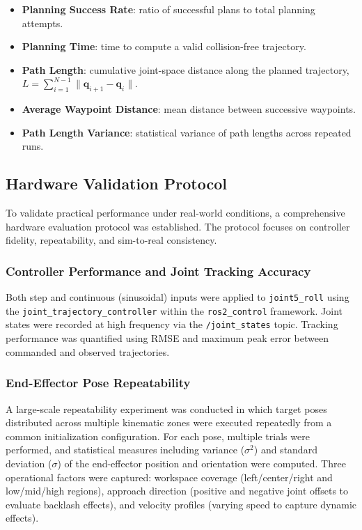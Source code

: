 \documentclass[conference]{IEEEtran}
\begin{document}
	\begin{itemize}
		\item \textbf{Planning Success Rate}: ratio of successful plans
		to total planning attempts.
		
		\item \textbf{Planning Time}: time to compute a valid
		collision-free trajectory.
		
		\item \textbf{Path Length}: cumulative joint-space distance
		along the planned trajectory,
		$L = \sum_{i=1}^{N-1}\|\mathbf{q}_{i+1} - \mathbf{q}_i\|$.
		
		\item \textbf{Average Waypoint Distance}: mean distance between
		successive waypoints.
		
		\item \textbf{Path Length Variance}: statistical variance of
		path lengths across repeated runs.
	\end{itemize}
	
	\subsection{Hardware Validation Protocol}
	
	To validate practical performance under real-world conditions, a
	comprehensive hardware evaluation protocol was established. The protocol focuses on controller fidelity, repeatability,
	and sim-to-real consistency.
	
	\subsubsection{Controller Performance and Joint Tracking Accuracy}
	
	Both step and continuous (sinusoidal) inputs were applied to
	\texttt{joint5\_roll} using the \texttt{joint\_trajectory\_controller}
	within the \texttt{ros2\_control} framework. Joint states were recorded
	at high frequency via the \texttt{/joint\_states} topic. Tracking
	performance was quantified using RMSE and maximum peak error between
	commanded and observed trajectories.
	
	\subsubsection{End-Effector Pose Repeatability}
	
	A large-scale repeatability experiment was conducted in which target
	poses distributed across multiple kinematic zones were executed
	repeatedly from a common initialization configuration. For each pose,
	multiple trials were performed, and statistical measures including
	variance ($\sigma^2$) and standard deviation ($\sigma$) of the
	end-effector position and orientation were computed. Three operational
	factors were captured: workspace coverage (left/center/right and
	low/mid/high regions), approach direction (positive and negative joint
	offsets to evaluate backlash effects), and velocity profiles (varying
	speed to capture dynamic effects).
	
\end{document}
